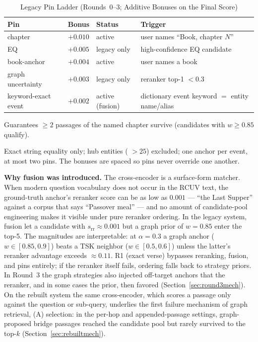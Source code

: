 \begin{table}[!t]
\caption{Legacy Pin Ladder (Rounds~0--3; Additive Bonuses on the Final Score)}
\label{tab:pins}
\centering
\begin{threeparttable}
\footnotesize
\begin{tabular}{@{}p{1.85cm}cp{1.3cm}p{2.9cm}@{}}
\toprule
Pin & Bonus & Status & Trigger \\
\midrule
chapter & $+0.010$ & active & user names ``Book, chapter $N$''
\tnote{a} \\
EQ & $+0.005$ & legacy only & high-confidence EQ candidate \\
book-anchor & $+0.004$ & active & user names a book \\
graph uncertainty & $+0.003$ & legacy only & reranker top-1 $<0.3$ \\
keyword-exact event & $+0.002$ & active (fusion) & dictionary event
keyword $=$ entity name/alias \tnote{b} \\
\bottomrule
\end{tabular}
\begin{tablenotes}\footnotesize
\item[a] Guarantees $\ge 2$ passages of the named chapter survive
(candidates with $w \ge 0.85$ qualify).
\item[b] Exact string equality only; hub entities
( $>25$) excluded; one anchor per event, at most
two pins. The bonuses are spaced so pins never override one another.
\end{tablenotes}
\end{threeparttable}
\end{table}

\textbf{Why fusion was introduced.} The cross-encoder is a surface-form
matcher. When modern question vocabulary does not occur in the RCUV text,
the ground-truth anchor's reranker score can be as low as $0.001$ ---
\eg ``the Last Supper'' against a corpus that says ``Passover meal'' ---
and no amount of candidate-pool engineering makes it visible under pure
reranker ordering. In the legacy system, fusion let a candidate with
$s_{\mathrm{rr}}\approx 0.001$ but a graph prior of $w=0.85$ enter the
top-5. The magnitudes are interpretable: at $\alpha=0.3$ a graph anchor
($w\in[0.85,0.9]$) beats a TSK neighbor ($w\in[0.5,0.6]$) unless the
latter's reranker advantage exceeds $\approx 0.11$. R1 (exact verse)
bypasses reranking, fusion, and pins entirely; if the reranker itself
fails, ordering falls back to strategy priors. In Round~3 the graph
strategies also injected off-target anchors that the reranker, and in
some cases the prior, then favored (Section~\ref{sec:round3mech}). On
the rebuilt system the same cross-encoder, which scores a passage only
against the question or sub-query, underlies the first failure
mechanism of graph retrieval, (A) selection: in the per-hop and
appended-passage settings, graph-proposed bridge passages reached the
candidate pool but rarely survived to the top-$k$
(Section~\ref{sec:rebuiltmech}).

